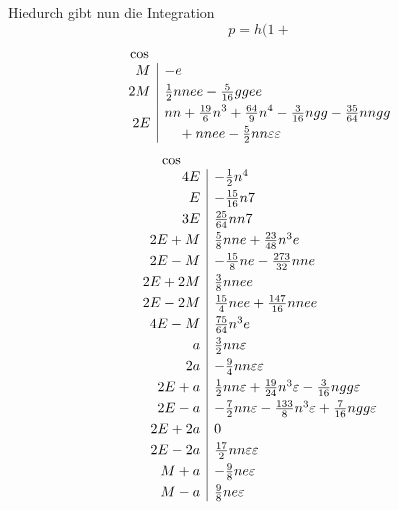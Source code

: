 \noindent Hiedurch gibt nun die Integration
\[
p=h(1+
\]
\[
\begin{array}{r|l}
\multicolumn{1}{c}{\cos}&\\
M&-e\\[3pt]
2M&\tfrac12nnee-\tfrac{5}{16}ggee\\[3pt]
2E&\begin{aligned}
&nn+\tfrac{19}{6}n^3+\tfrac{64}{9}n^4-\tfrac{3}{16}ngg-\tfrac{35}{64}nngg\\
&\quad+nnee-\tfrac52nn\varepsilon\varepsilon
\end{aligned}
\end{array}
\]
\clearpage
{}\thispagestyle{VIIPrinted639}
\[
\begin{array}{r|l}
\multicolumn{1}{c}{\cos}&\\
4E&-\tfrac12n^4\\[3pt]
E&-\tfrac{15}{16}n7\\[3pt]
3E&\tfrac{25}{64}nn7\\[3pt]
2E+M&\tfrac58nne+\tfrac{23}{48}n^3e\\[3pt]
2E-M&-\tfrac{15}{8}ne-\tfrac{273}{32}nne\\[3pt]
2E+2M&\tfrac38nnee\\[3pt]
2E-2M&\tfrac{15}{4}nee+\tfrac{147}{16}nnee\\[3pt]
4E-M&\tfrac{75}{64}n^3e\\[3pt]
a&\tfrac32nn\varepsilon\\[3pt]
2a&-\tfrac94nn\varepsilon\varepsilon\\[3pt]
2E+a&\tfrac12nn\varepsilon+\tfrac{19}{24}n^3\varepsilon-\tfrac{3}{16}ngg\varepsilon\\[3pt]
2E-a&-\tfrac72nn\varepsilon-\tfrac{133}{8}n^3\varepsilon+\tfrac{7}{16}ngg\varepsilon\\[3pt]
2E+2a&0\\[3pt]
2E-2a&\tfrac{17}{2}nn\varepsilon\varepsilon\\[3pt]
M+a&-\tfrac98ne\varepsilon\\[3pt]
M-a&\tfrac98ne\varepsilon
\end{array}
\]
